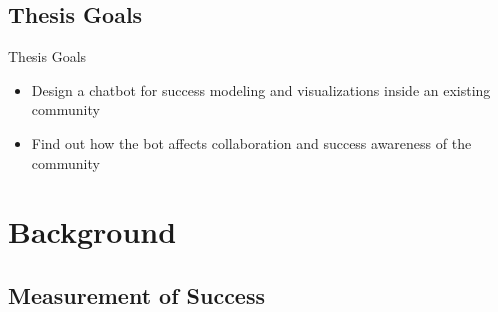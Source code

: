 \subsection{Thesis Goals}

\begin{frame}{Thesis Goals}
  \begin{itemize}
    \item Design a chatbot for success modeling and visualizations
          inside an existing community
    \item Find out how the bot affects collaboration and success awareness of the community %
  \end{itemize}
\end{frame}

\section{Background}

\subsection{Measurement of Success}




